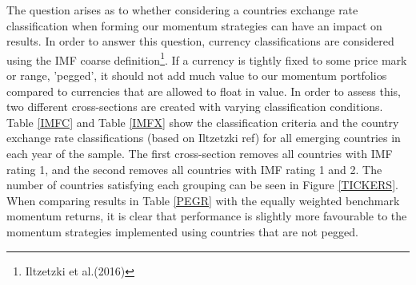\documentclass{article}
\begin{document}
The question arises as to whether considering a countries exchange rate classification when forming our momentum strategies can have an impact on results. In order to answer this question, currency classifications are considered using the IMF coarse definition\footnote{Iltzetzki et al.(2016)}. If a currency is tightly fixed to some price mark or range, 'pegged', it should not add much value to our momentum portfolios compared to currencies that are allowed to float in value. In order to assess this, two different cross-sections are created with varying classification conditions. Table \ref{IMFC} and Table \ref{IMFX} show the classification criteria and the country exchange rate classifications (based on Iltzetzki  ref) for all emerging countries in each year of the sample. The first cross-section removes all countries with IMF rating 1, and the second removes all countries with IMF rating 1 and 2. The number of countries satisfying each grouping can be seen in Figure \ref{TICKERS}. \\

When comparing results in Table \ref{PEGR} with the equally weighted benchmark momentum returns, it is clear that performance is slightly more favourable to the momentum strategies implemented using countries that are not pegged.
\end{document}
